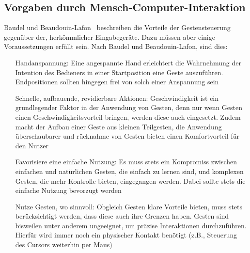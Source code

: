 \subsection{Vorgaben durch Mensch-Computer-Interaktion}
\label{subsec:MCI}
Baudel und Beaudouin-Lafon~\cite{bib:baudel} beschreiben die Vorteile der Gestensteuerung gegen\"uber der, herk\"ommlicher Eingabeger\"ate. Dazu m\"ussen aber einige Voraussetzungen erf\"ullt sein. Nach Baudel und Beaudouin-Lafon, sind dies:
\begin{itemize}
\item[Handanspannung:] Eine angespannte Hand erleichtert die Wahrnehmung der Intention des Bedieners in einer Startposition eine Geste auszuf\"uhren. Endpositionen sollten hingegen frei von solch einer Anspannung sein
\item[Schnelle, aufbauende, revidierbare Aktionen:] Geschwindigkeit ist ein grundlegender Faktor in der Anwendung von Gesten, denn nur wenn Gesten einen Geschwindigkeitsvorteil bringen, werden diese auch eingesetzt. Zudem macht der Aufbau einer Geste aus kleinen Teilgesten, die Anwendung \"uberschaubarer und r\"ucknahme von Gesten bieten einen Komfortvorteil f\"ur den Nutzer
\item[Favorisiere eine einfache Nutzung:] Es muss stets ein Kompromiss zwischen einfachen und nat\"urlichen Gesten, die einfach zu lernen sind, und komplexen Gesten, die mehr Kontrolle bieten, eingegangen werden. Dabei sollte stets die einfache Nutzung bevorzugt werden
\item[Nutze Gesten, wo sinnvoll:] Obgleich Gesten klare Vorteile bieten, muss stets ber\"ucksichtigt werden, dass diese auch ihre Grenzen haben. Gesten sind bisweilen unter anderem ungeeignet, um pr\"azise Interaktionen durchzuf\"uhren. Hierf\"ur wird immer noch ein physischer Kontakt ben\"otigt (z.B., Steuerung des Cursors weiterhin per Maus)
\end{itemize}

